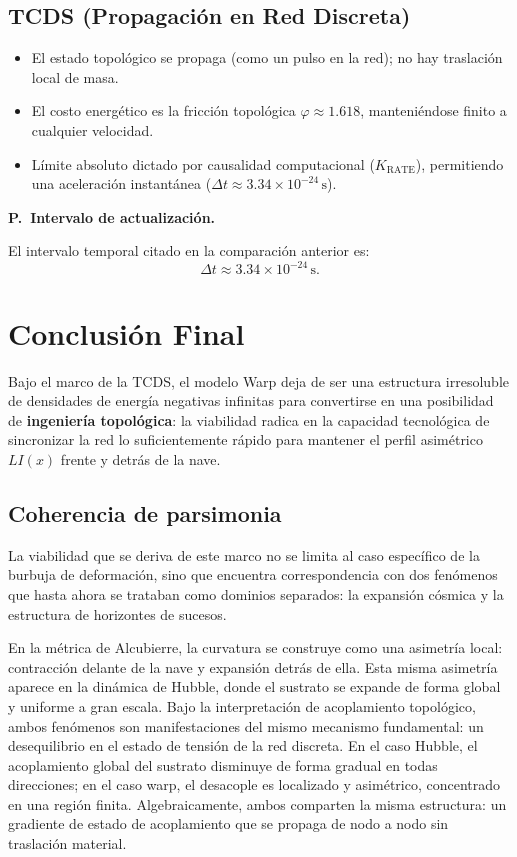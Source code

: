 \documentclass[10pt,a4paper,twocolumn]{article}
\newcounter{parrafoecuacion}
\newcommand{\parrafoecuacion}[2]{%
    \par\smallskip\Needspace{6\baselineskip}%
    \noindent\refstepcounter{parrafoecuacion}\label{#1}%
    \textbf{P\theparrafoecuacion.\ #2.}\enspace
}
\begin{document}
\subsection*{TCDS (Propagación en Red Discreta)}
\begin{itemize}
    \item El estado topológico se propaga (como un pulso en la red); no hay traslación local de masa.
    \item El costo energético es la fricción topológica $\varphi \approx 1.618$, manteniéndose finito a cualquier velocidad.
    \item Límite absoluto dictado por causalidad computacional ($K_{\text{RATE}}$), permitiendo una aceleración instantánea ($\Delta t \approx 3.34 \times 10^{-24}\,\mathrm{s}$).
\end{itemize}

\parrafoecuacion{par:intervalo-causal}{Intervalo de actualización}
El intervalo temporal citado en la comparación anterior es:
\begin{equation}
    \Delta t \approx 3.34 \times 10^{-24}\,\mathrm{s}.
    \label{eq:intervalo-causal}
\end{equation}

\section{Conclusión Final}
Bajo el marco de la TCDS, el modelo Warp deja de ser una estructura  irresoluble de densidades de energía negativas infinitas para convertirse en una posibilidad de \textbf{ingeniería topológica}: la viabilidad radica en la capacidad tecnológica de sincronizar la red lo suficientemente rápido para mantener el perfil asimétrico $LI(x)$ frente y detrás de la nave.
\subsection{Coherencia de parsimonia}
La viabilidad que se deriva de este marco no se limita al caso específico de la burbuja de deformación, sino que encuentra correspondencia con dos fenómenos que hasta ahora se trataban como dominios separados: la expansión cósmica y la estructura de horizontes de sucesos.

En la métrica de Alcubierre, la curvatura se construye como una asimetría local: contracción delante de la nave y expansión detrás de ella. Esta misma asimetría aparece en la dinámica de Hubble, donde el sustrato se expande de forma global y uniforme a gran escala. Bajo la interpretación de acoplamiento topológico, ambos fenómenos son manifestaciones del mismo mecanismo fundamental: un desequilibrio en el estado de tensión de la red discreta. En el caso Hubble, el acoplamiento global del sustrato disminuye de forma gradual en todas direcciones; en el caso warp, el desacople es localizado y asimétrico, concentrado en una región finita. Algebraicamente, ambos comparten la misma estructura: un gradiente de estado de acoplamiento que se propaga de nodo a nodo sin traslación material.
\end{document}

